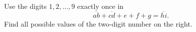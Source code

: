 Use the digits $1,2,\ldots,9$ exactly once in
\[\overline{ab}+\overline{cd}+e+f+g=\overline{hi}.\]
Find all possible values of the two-digit number on the right.
